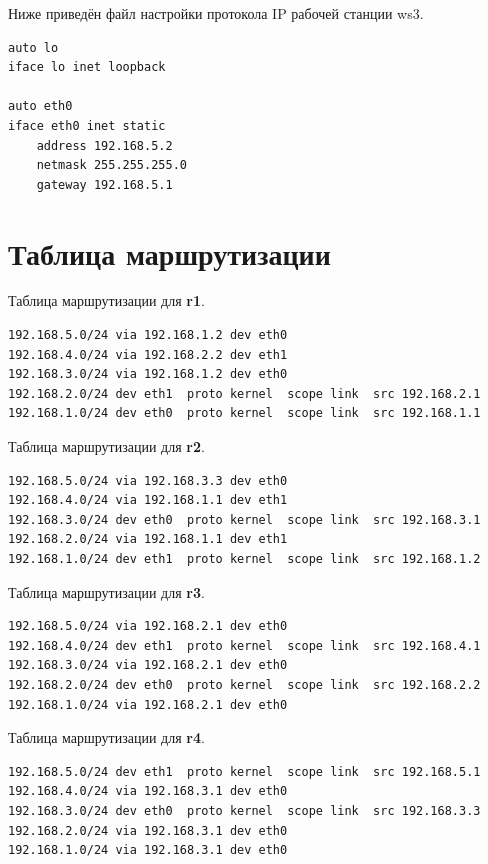 \documentclass[a4paper,12pt]{article}
\begin{document}
Ниже приведён файл настройки протокола IP рабочей станции ws3.

\begin{Verbatim}
auto lo
iface lo inet loopback

auto eth0
iface eth0 inet static
    address 192.168.5.2
    netmask 255.255.255.0
    gateway 192.168.5.1
\end{Verbatim}



\section{Таблица маршрутизации}

Таблица маршрутизации для \textbf{r1}.

\begin{Verbatim}
192.168.5.0/24 via 192.168.1.2 dev eth0 
192.168.4.0/24 via 192.168.2.2 dev eth1 
192.168.3.0/24 via 192.168.1.2 dev eth0 
192.168.2.0/24 dev eth1  proto kernel  scope link  src 192.168.2.1 
192.168.1.0/24 dev eth0  proto kernel  scope link  src 192.168.1.1
\end{Verbatim}

Таблица маршрутизации для \textbf{r2}.

\begin{Verbatim}
192.168.5.0/24 via 192.168.3.3 dev eth0 
192.168.4.0/24 via 192.168.1.1 dev eth1 
192.168.3.0/24 dev eth0  proto kernel  scope link  src 192.168.3.1 
192.168.2.0/24 via 192.168.1.1 dev eth1 
192.168.1.0/24 dev eth1  proto kernel  scope link  src 192.168.1.2
\end{Verbatim}

Таблица маршрутизации для \textbf{r3}.

\begin{Verbatim}
192.168.5.0/24 via 192.168.2.1 dev eth0 
192.168.4.0/24 dev eth1  proto kernel  scope link  src 192.168.4.1 
192.168.3.0/24 via 192.168.2.1 dev eth0 
192.168.2.0/24 dev eth0  proto kernel  scope link  src 192.168.2.2 
192.168.1.0/24 via 192.168.2.1 dev eth0
\end{Verbatim}

Таблица маршрутизации для \textbf{r4}.

\begin{Verbatim}
192.168.5.0/24 dev eth1  proto kernel  scope link  src 192.168.5.1 
192.168.4.0/24 via 192.168.3.1 dev eth0 
192.168.3.0/24 dev eth0  proto kernel  scope link  src 192.168.3.3 
192.168.2.0/24 via 192.168.3.1 dev eth0 
192.168.1.0/24 via 192.168.3.1 dev eth0
\end{Verbatim}
\end{document}
